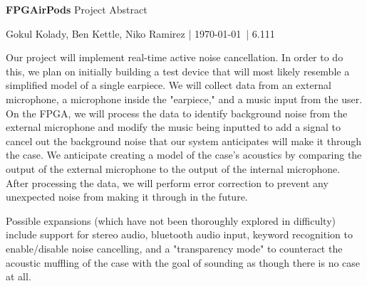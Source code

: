 \documentclass[12pt]{article}
\begin{document}
{\Huge \sffamily \textbf{FPGAirPods} Project Abstract}

\vspace{2mm}
{\sffamily Gokul Kolady, Ben Kettle, Niko Ramirez | \today \ | 6.111}
\vspace{5mm}

Our project will implement real-time active noise cancellation. In order to do this, we plan on initially building a test device that will most likely resemble a simplified model of a single earpiece. We will collect data from an external microphone, a microphone inside the "earpiece," and a music input from the user. On the FPGA, we will process the data to identify background noise from the external microphone and modify the music being inputted to add a signal to cancel out the background noise that our system anticipates will make it through the case. We anticipate creating a model of the case's acoustics by comparing the output of the external microphone to the output of the internal microphone. After processing the data, we will perform error correction to prevent any unexpected noise from making it through in the future. 

Possible expansions (which have not been thoroughly explored in difficulty) include support for stereo audio, bluetooth audio input, keyword recognition to enable/disable noise cancelling, and a "transparency mode" to counteract the acoustic muffling of the case with the goal of sounding as though there is no case at all.
\end{document}
